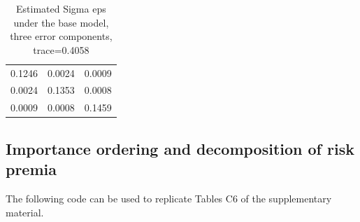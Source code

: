\documentclass[
]{article}
\begin{document}
\begin{table}[H]

\caption{\label{tab:unnamed-chunk-33}Estimated Sigma eps under the base model, three error components, trace=0.4058}
\centering
\begin{tabular}[t]{rrr}
\toprule
0.1246 & 0.0024 & 0.0009\\
0.0024 & 0.1353 & 0.0008\\
0.0009 & 0.0008 & 0.1459\\
\bottomrule
\end{tabular}
\end{table}

\hypertarget{importance-ordering-and-decomposition-of-risk-premia}{%
\subsection{Importance ordering and decomposition of risk
premia}\label{importance-ordering-and-decomposition-of-risk-premia}}

The following code can be used to replicate Tables C6 of the
supplementary material.
\end{document}
